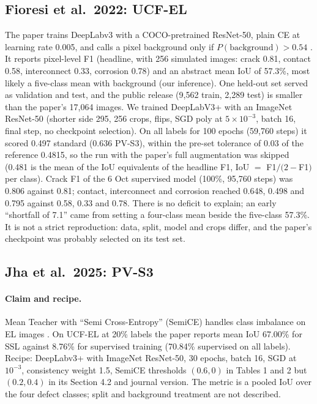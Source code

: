 \subsection{Fioresi et al.\ 2022: UCF-EL}\label{sec:repro-fioresi}

The paper trains DeepLabv3 with a COCO-pretrained ResNet-50, plain CE at learning rate 0.005, and calls a pixel background only if
$P(\text{background}) > 0.54$ \citep{fioresi2022ucfel}. It reports pixel-level F1 (headline, with 256 simulated images: crack 0.81,
contact 0.58, interconnect 0.33, corrosion 0.78) and an abstract mean IoU of 57.3\%, most likely a five-class mean with background (our
inference). One held-out set served as validation and test, and the public release (9,562 train, 2,289 test) is smaller than the
paper's 17,064 images. We trained DeepLabV3+ with an ImageNet ResNet-50 (shorter side 295, 256 crops, flips, SGD poly at
$5 \times 10^{-3}$, batch 16, final step, no checkpoint selection). On all labels for 100 epochs (59,760 steps) it scored 0.497 standard
(0.636 PV-S3), within the pre-set tolerance of 0.03 of the reference 0.4815, so the run with the paper's full augmentation was skipped
(0.481 is the mean of the IoU equivalents of the headline F1, IoU $=$ F1$/(2-$F1$)$ per class). Crack F1 of the 6 Oct supervised model
(100\%, 95,760 steps) was 0.806 against 0.81; contact, interconnect and corrosion reached 0.648, 0.498 and 0.795 against 0.58, 0.33 and
0.78. There is no deficit to explain; an early ``shortfall of 7.1'' came from setting a four-class mean beside the five-class 57.3\%.
It is not a strict reproduction: data, split, model and crops differ, and the paper's checkpoint was probably selected on its test set.

\subsection{Jha et al.\ 2025: PV-S3}\label{sec:repro-pvs3}

\paragraph{Claim and recipe.} Mean Teacher with ``Semi Cross-Entropy'' (SemiCE) handles class imbalance on EL images
\citep{jha2025pvs3}. On UCF-EL at 20\% labels the paper reports mean IoU 67.00\% for SSL against 8.76\% for supervised training (70.84\%
supervised on all labels). Recipe: DeepLabv3+ with ImageNet ResNet-50, 30 epochs, batch 16, SGD at $10^{-3}$, consistency weight 1.5,
SemiCE thresholds $(0.6, 0)$ in Tables 1 and 2 but $(0.2, 0.4)$ in its Section 4.2 and journal version. The metric is a pooled IoU over
the four defect classes; split and background treatment are not described.

